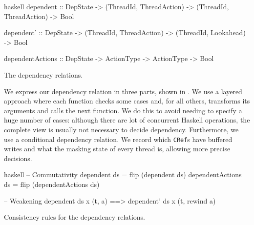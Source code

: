 \begin{listing}
\centering
\begin{cminted}{haskell}
dependent
  :: DepState
  -> (ThreadId, ThreadAction) -> (ThreadId, ThreadAction) -> Bool

dependent'
  :: DepState
  -> (ThreadId, ThreadAction) -> (ThreadId, Lookahead)    -> Bool

dependentActions
  :: DepState
  -> ActionType -> ActionType                             -> Bool
\end{cminted}
\caption{The \dejafu{} dependency relations.}\label{lst:deprel-simp}
\end{listing}

We express our dependency relation in three parts, shown in
.  We use a layered approach where each function
checks some cases and, for all others, transforms its arguments and
calls the next function.  We do this to avoid needing to specify a
huge number of cases: although there are lot of concurrent Haskell
operations, the complete view is usually not necessary to decide
dependency.  Furthermore, we use a conditional dependency
relation\cite{godefroid1993}.  We record which \verb|CRef|s have
buffered writes and what the masking state of every thread is,
allowing more precise decisions.

\begin{listing}
\centering
\begin{cminted}{haskell}
-- Commutativity
dependent        ds = flip (dependent        ds)
dependentActions ds = flip (dependentActions ds)

-- Weakening
dependent ds x (t, a) ==> dependent' ds x (t, rewind a)
\end{cminted}
\caption{Consistency rules for the dependency relations.}\label{lst:deprel-consistency}
\end{listing}

